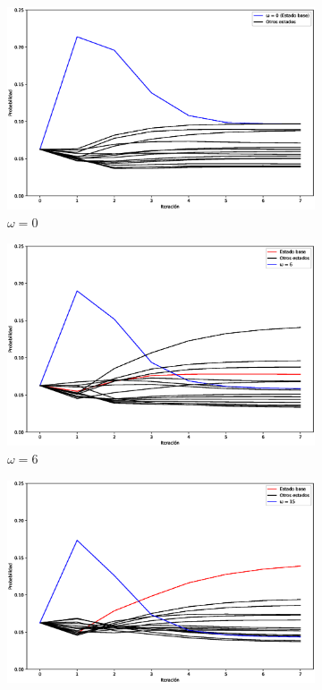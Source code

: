 \begin{figure}[H]
    \centering
    \begin{subfigure}[m]{0.49\textwidth}
        \centering
        \includegraphics[width=0.99\linewidth]{img/grover0000loss.eps}
        \caption{$\omega = 0$}
        \label{fig:groverloss0000}
    \end{subfigure}
    \begin{subfigure}[m]{0.49\textwidth}
        \centering
        \includegraphics[width=0.99\linewidth]{img/grover0110loss.eps}
        \caption{$\omega = 6$}
        \label{fig:groverloss0110}
    \end{subfigure}
    \begin{subfigure}[m]{0.49\textwidth}
        \centering
        \includegraphics[width=0.99\linewidth]{img/groverallloss.eps}

\end{subfigure}
\end{figure}
